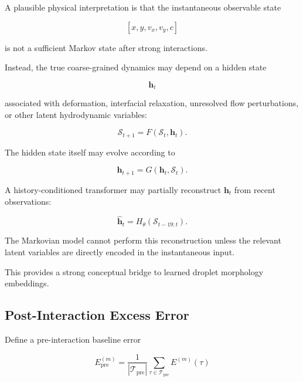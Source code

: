 \documentclass[11pt]{article}
\begin{document}
A plausible physical interpretation is that the instantaneous observable state

\begin{equation}
\left[
x,y,v_x,v_y,c
\right]
\end{equation}

is not a sufficient Markov state after strong interactions.

Instead, the true coarse-grained dynamics may depend on a hidden state

\begin{equation}
\mathbf{h}_t
\end{equation}

associated with deformation, interfacial relaxation, unresolved flow perturbations, or other latent hydrodynamic variables:

\begin{equation}
\mathcal{S}_{t+1}
=
F
\left(
\mathcal{S}_t,
\mathbf{h}_t
\right).
\end{equation}

The hidden state itself may evolve according to

\begin{equation}
\mathbf{h}_{t+1}
=
G
\left(
\mathbf{h}_t,
\mathcal{S}_t
\right).
\end{equation}

A history-conditioned transformer may partially reconstruct \(\mathbf{h}_t\) from recent observations:

\begin{equation}
\hat{\mathbf{h}}_t
=
H_{\theta}
\left(
\mathcal{S}_{t-19:t}
\right).
\end{equation}

The Markovian model cannot perform this reconstruction unless the relevant latent variables are directly encoded in the instantaneous input.

This provides a strong conceptual bridge to learned droplet morphology embeddings.

\subsection{Post-Interaction Excess Error}

Define a pre-interaction baseline error

\begin{equation}
E_{\mathrm{pre}}^{(m)}
=
\frac{1}{|\mathcal{T}_{\mathrm{pre}}|}
\sum_{\tau\in\mathcal{T}_{\mathrm{pre}}}
E^{(m)}(\tau)
\end{equation}
\end{document}

